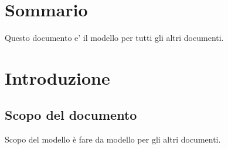 \tableofcontents


\chapter*{Sommario}
Questo documento e' il modello per tutti gli altri documenti.


\thispagestyle{fancy} %

\chapter{Introduzione}
\thispagestyle{fancy} %

\section{Scopo del documento}
Scopo del modello \`e fare da modello per gli altri documenti.





